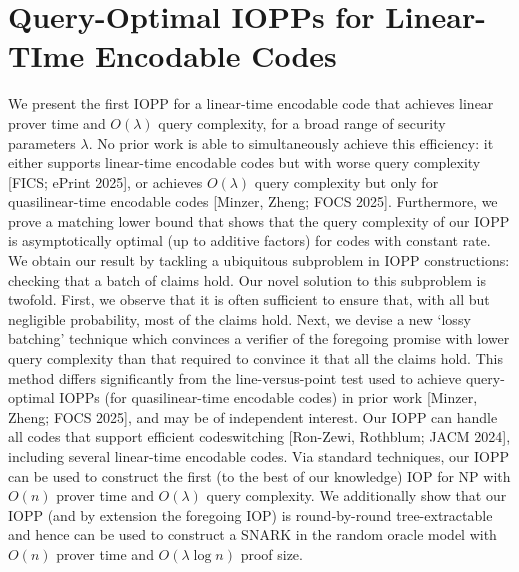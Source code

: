 \documentclass[11pt]{article}
\theoremstyle{definition}
\theoremstyle{remark}
\theoremstyle{plain}
\begin{document}
\section{\cite{cryptoeprint:2025/1588} Query-Optimal IOPPs for Linear-TIme Encodable Codes}
We present the first IOPP for a linear-time encodable code that achieves linear prover time and $O(\lambda)$ query complexity, for a broad range of security parameters $\lambda$. No prior work is able to simultaneously achieve this efficiency: it either supports linear-time encodable codes but with worse query complexity [FICS; ePrint 2025], or achieves $O(\lambda)$ query complexity but only for quasilinear-time encodable codes [Minzer, Zheng; FOCS 2025]. Furthermore, we prove a matching lower bound that shows that the query complexity of our IOPP is asymptotically optimal (up to additive factors) for codes with constant rate. We obtain our result by tackling a ubiquitous subproblem in IOPP constructions: checking that a batch of claims hold. Our novel solution to this subproblem is twofold. First, we observe that it is often sufficient to ensure that, with all but negligible probability, most of the claims hold. Next, we devise a new `lossy batching' technique which convinces a verifier of the foregoing promise with lower query complexity than that required to convince it that all the claims hold. This method differs significantly from the line-versus-point test used to achieve query-optimal IOPPs (for quasilinear-time encodable codes) in prior work [Minzer, Zheng; FOCS 2025], and may be of independent interest. Our IOPP can handle all codes that support efficient codeswitching [Ron-Zewi, Rothblum; JACM 2024], including several linear-time encodable codes. Via standard techniques, our IOPP can be used to construct the first (to the best of our knowledge) IOP for NP with $O(n)$ prover time and $O(\lambda)$ query complexity. We additionally show that our IOPP (and by extension the foregoing IOP) is round-by-round tree-extractable and hence can be used to construct a SNARK in the random oracle model with $O(n)$ prover time and $O(\lambda \log n)$ proof size.


\cite{cryptoeprint:2024/474} 
\end{document}
